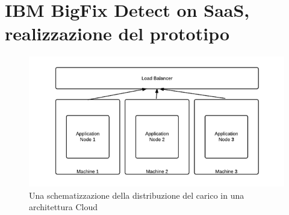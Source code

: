 \chapter{IBM BigFix Detect on SaaS, realizzazione del prototipo}

\begin{figure}[h!]
	\centering
	\includegraphics[width=\textwidth,keepaspectratio=true]{capitoli/imgs/LoadBalancer.png}
	\caption{Una schematizzazione della distribuzione del carico in una architettura Cloud}
\end{figure}